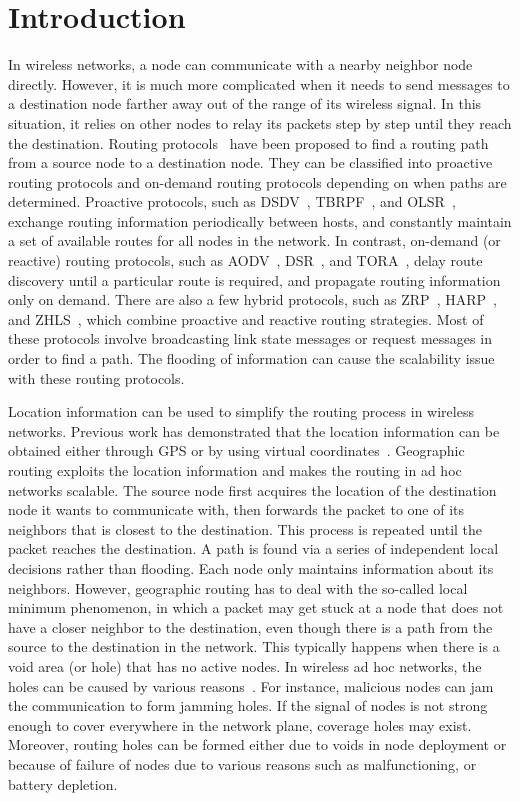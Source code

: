 \documentclass[3p,times]{elsarticle}
\begin{document}
\section{Introduction}
\label{intro}

In wireless networks, a node can communicate with a nearby neighbor node directly.
However, it is much more complicated when it needs to send messages to a destination
node farther away out of the range of its wireless signal. In this situation,
it relies on other nodes to relay its packets step by step until
they reach the destination.
Routing protocols~\cite{ex1,ex2,ex3,ex4,ex5,ex6} have been proposed to
find a routing path from a source node to a destination node.
They can be classified into proactive routing protocols and
on-demand routing protocols depending on when paths are determined.
Proactive protocols, such as DSDV~\cite{ex1}, TBRPF~\cite{ex2},
and OLSR~\cite{ex3}, exchange routing information periodically between hosts,
and constantly maintain a set of available
routes for all nodes in the network.
In contrast, on-demand (or reactive) routing protocols,
such as AODV~\cite{ex4}, DSR~\cite{ex5}, and TORA~\cite{ex6},
delay route discovery until a particular route is required, and propagate routing information only on demand.
There are also a few hybrid protocols, such as ZRP~\cite{ex7}, HARP~\cite{ex8}, and ZHLS~\cite{ex9},
which combine proactive and reactive routing strategies.
Most of these protocols involve broadcasting link state messages or
request messages in order to find a path. The flooding of information
can cause the scalability issue with these routing protocols.

Location information can be used to simplify the routing process in wireless networks.
Previous work has demonstrated that the location information can be obtained
either through GPS or by using virtual coordinates~\cite{ex10,ex11,ex12}.
Geographic routing exploits the location information and makes
the routing in ad hoc networks scalable.
The source node first acquires the
location of the destination node it wants to communicate with, then forwards the packet to one of its
neighbors that is closest to the destination.
This process is repeated until the packet reaches the destination.
A path is found via a series of independent local decisions rather than flooding.
Each node only maintains information about its neighbors.
However, geographic routing has to deal with the so-called local minimum phenomenon,
in which a packet may get stuck at a node that does not have a closer neighbor
to the destination, even though there is a path from the source to the destination
in the network.
This typically happens when there is a void area (or hole) that has no active nodes.
In wireless
ad hoc networks, the holes can be caused by various reasons~\cite{ex24}.
For instance, malicious nodes can jam
the communication to form jamming holes.
If the signal of nodes is not strong enough to cover everywhere in the network plane,
coverage holes may exist. Moreover, routing holes
can be formed either due to voids in node deployment or because of failure of nodes due to various reasons such as
malfunctioning, or battery depletion.
\end{document}
